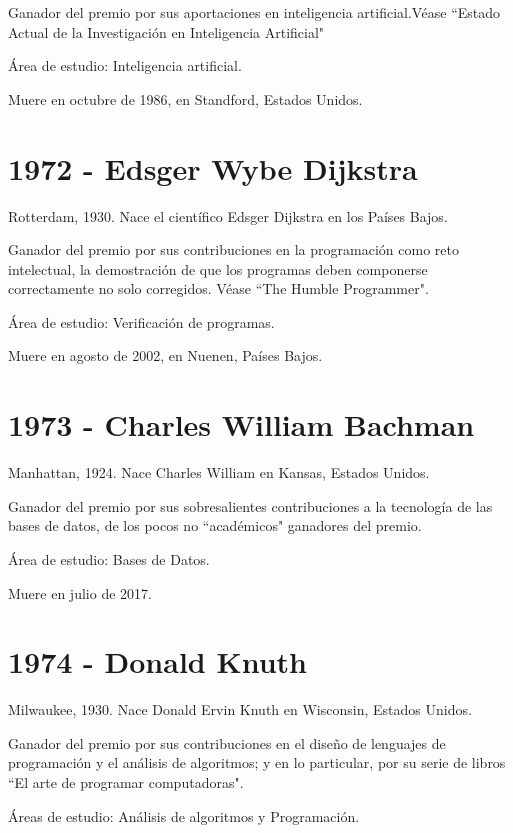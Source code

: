 \documentclass[notitlepage,letterpaper, 11pt]{article}
\begin{document}
\noindent Ganador del premio por sus aportaciones en inteligencia artificial.Véase ``Estado Actual de la Investigación en Inteligencia Artificial"

\noindent Área de estudio: Inteligencia artificial.

\noindent Muere en octubre de 1986, en Standford, Estados Unidos.
\newline

\section*{1972 - Edsger Wybe Dijkstra}
\noindent Rotterdam, 1930. Nace el científico Edsger Dijkstra en los Países Bajos.

\noindent Ganador del premio por sus contribuciones en la programación como reto intelectual, la demostración de que los programas deben componerse correctamente no solo corregidos. Véase ``The Humble Programmer".

\noindent Área de estudio: Verificación de programas.

\noindent Muere en agosto de 2002, en Nuenen, Países Bajos.
\newpage

\section*{1973 - Charles William Bachman}
\noindent Manhattan, 1924. Nace Charles William en Kansas, Estados Unidos.

\noindent Ganador del premio por sus sobresalientes contribuciones a la tecnología de las bases de datos, de los pocos no ``académicos" ganadores del premio.

\noindent Área de estudio: Bases de Datos.

\noindent Muere en julio de 2017.
\newline

\section*{1974 - Donald Knuth}
\noindent Milwaukee, 1930. Nace Donald Ervin Knuth en Wisconsin, Estados Unidos.

\noindent Ganador del premio por sus contribuciones en el diseño de lenguajes de programación y el análisis de algoritmos; y en lo particular, por su serie de libros ``El arte de programar computadoras".

\noindent Áreas de estudio: Análisis de algoritmos y Programación.
\newline
\end{document}
